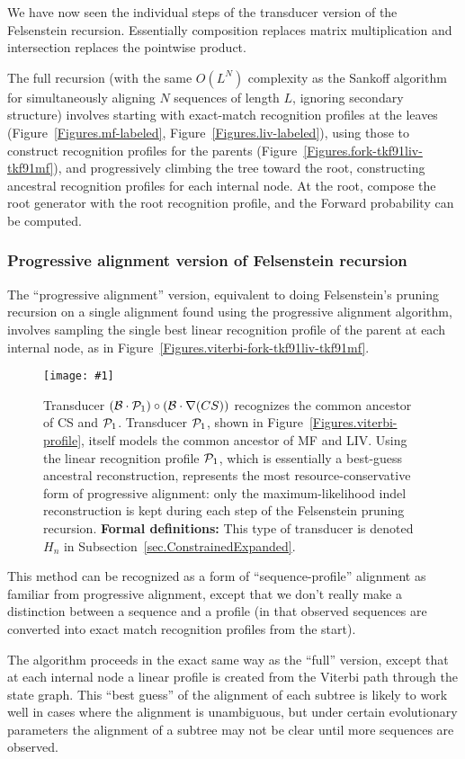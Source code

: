 \documentclass{article}
\newcommand{\secref}[1]{Subsection~\ref{sec.#1}}
\newcommand{\figref}[1]{Figure~\ref{Figures.#1}}
\newcommand{\figlabel}[1]{\label{Figures.#1}}
\newcommand{\easyfig}[4]{
\begin{figure}
\texttt{[image: \#1]}
\caption{ \figlabel{#3} #4}
\end{figure}}
\newcommand{\widepdffig}[2]{\easyfig{#1-fig.pdf}{width=\textwidth}{#1}{#2}}
\newcommand\tkf{{\cal B}}
\newcommand\profile{{\cal P}}
\newcommand\formaldefs{{\bf Formal definitions: }}
\newcommand\fork{\circ}
\newcommand\recognize{\nabla}
\begin{document}
We have now seen the individual steps of the 
transducer version of the Felsenstein recursion.
Essentially composition replaces matrix multiplication and intersection replaces the 
pointwise product.  

The full recursion (with the same $O(L^N)$ complexity as the Sankoff algorithm \cite{SankoffCedergren83}
for simultaneously aligning $N$ sequences of length $L$, ignoring secondary structure)
involves starting with exact-match recognition profiles at the leaves (\figref{mf-labeled}, \figref{liv-labeled}),
using those to construct recognition profiles for the parents (\figref{fork-tkf91liv-tkf91mf}),
and progressively climbing the tree toward the root,
constructing ancestral recognition profiles for each internal node. 
At the root, compose the root generator with the root recognition profile,
and the Forward probability can be computed. 

\subsubsection{Progressive alignment version of Felsenstein recursion}

The ``progressive alignment'' version,
equivalent to doing Felsenstein's pruning recursion on a single alignment
found using the progressive alignment algorithm,
involves sampling the single best linear recognition profile of the parent
 at each internal node, 
as in \figref{viterbi-fork-tkf91liv-tkf91mf}.  

\widepdffig{fork-tkf91viterbi-tkf91cs}{Transducer $(\tkf \cdot \profile_1)\fork(\tkf \cdot \recognize(CS))$ recognizes the common ancestor of CS and $\profile_1$.
Transducer $\profile_1$, shown in \figref{viterbi-profile}, itself models the common ancestor of MF and LIV.
Using the linear recognition profile $\profile_1$, which is essentially a best-guess ancestral reconstruction, represents the most resource-conservative form of progressive alignment: only the 
maximum-likelihood indel reconstruction is kept during each step of the Felsenstein pruning recursion.
\formaldefs
This type of transducer is denoted $H_n$ in \secref{ConstrainedExpanded}.
}

This method can be recognized as a form of ``sequence-profile''
 alignment as familiar from progressive alignment,
except that we don't really make a distinction between a sequence and a profile
(in that observed sequences are converted into exact match recognition
 profiles from the start).

The algorithm proceeds in the exact same way as the ``full'' version, 
except that at each internal node a linear profile is created from the Viterbi
path through the state graph.  This ``best guess'' of the alignment of each subtree
is likely to work well in cases where the alignment is unambiguous, but under
certain evolutionary parameters the alignment of a subtree may not be clear
until more sequences are observed. 
\end{document}
